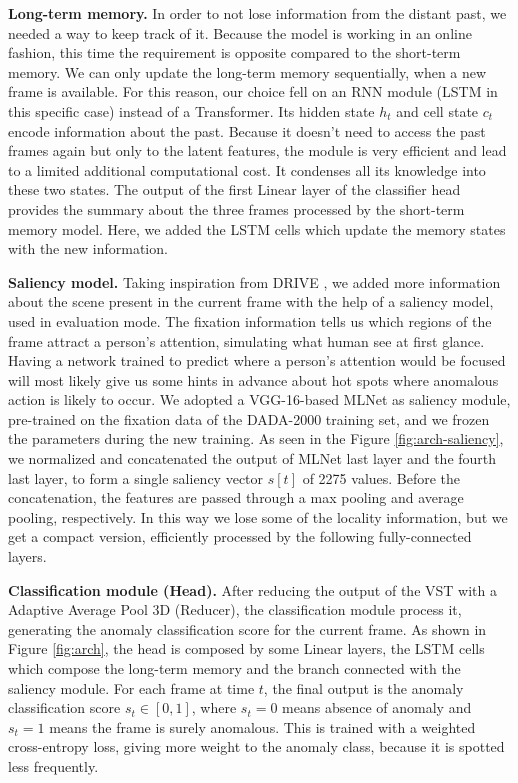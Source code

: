 \noindent\textbf{Long-term memory.}
In order to not lose information from the distant past, we needed a way to keep track of it.
Because the model is working in an online fashion, this time the requirement is opposite compared to the short-term memory.
We can only update the long-term memory sequentially, when a new frame is available.
For this reason, our choice fell on an RNN module (LSTM in this specific case) instead of a Transformer.
Its hidden state $h_t$ and cell state $c_t$ encode information about the past.
Because it doesn't need to access the past frames again but only to the latent features, the module is very efficient and lead to a limited additional computational cost.
It condenses all its knowledge into these two states.
The output of the first Linear layer of the classifier head provides the summary about the three frames processed by the short-term memory model.
Here, we added the LSTM cells which update the memory states with the new information.

\noindent\textbf{Saliency model.}
Taking inspiration from DRIVE \cite{bao2021drive}, we added more information about the scene present in the current frame with the help of a saliency model, used in evaluation mode.
The fixation information tells us which regions of the frame attract a person's attention, simulating what human see at first glance.
Having a network trained to predict where a person's attention would be focused will most likely give us some hints in advance about hot spots where anomalous action is likely to occur.
We adopted a VGG-16-based MLNet \cite{cornia2016deep} as saliency module, pre-trained on the fixation data of the DADA-2000 \cite{fang2019dada} training set, and we frozen the parameters during the new training.
As seen in the Figure \ref{fig:arch-saliency}, we normalized and concatenated the output of MLNet last layer and the fourth last layer, to form a single saliency vector $s[t]$ of 2275 values.
Before the concatenation, the features are passed through a max pooling and average pooling, respectively.
In this way we lose some of the locality information, but we get a compact version, efficiently processed by the following fully-connected layers.

\noindent\textbf{Classification module (Head).}
After reducing the output of the VST with a Adaptive Average Pool 3D (Reducer), the classification module process it, generating the anomaly classification score for the current frame.
As shown in Figure \ref{fig:arch}, the head is composed by some Linear layers, the LSTM cells which compose the long-term memory and the branch connected with the saliency module.
For each frame at time $t$, the final output is the anomaly classification score $s_t \in [0,1]$, where $s_t=0$ means absence of anomaly and $s_t=1$ means the frame is surely anomalous.
This is trained with a weighted cross-entropy loss, giving more weight to the anomaly class, because it is spotted less frequently. 

